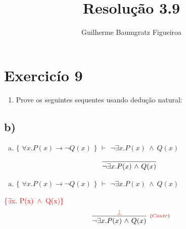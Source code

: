 \documentclass[aspectratio=43]{beamer}
\title[\sc{Resolu\c c\~ao}]{Resolu\c c\~ao 3.9}
\author[Guilherme Baumgratz Figueiroa]{Guilherme Baumgratz Figueiroa}
\institute[UFOP]{Universidade Federal de Ouro Preto} %
\date{}
\newcommand{\ex}{$\exists$}
\newcommand{\nao}{$\neg$}
\newcommand{\nex}{\nao\ex}
\newcommand{\andd}{$\wedge$}
\begin{document}
	
	\begin{frame}
		\titlepage
	\end{frame}
	
	\section{Exercic\'io 9}
	
	\begin{frame}%
    
    	\begin{enumerate}[1.]
			\item Prove os seguintes sequentes usando dedu\c c\~ao natural: \\
		\end{enumerate}
				
	\end{frame}
    \subsection{b)}
    
	\begin{frame}[fragile]
    	
    	\begin{enumerate}[b)]
			
			\item $\{$ $\forall x.P(x)\to \neg Q(x)$ $\}$ $\vdash$ $ \neg\exists  x.P(x)\ \wedge\ Q(x)$ \\ 
			
		\end{enumerate}
        \vspace{100pt}
        \[
        \begin{array}{c}
		
        	\infer[_{}]
            {$\nex$  x. P(x)\ $\andd$\ Q(x)}
            {}
        
		\end{array}
        \]
        
	\end{frame}
    
    \begin{frame}[fragile]
    	
    	\begin{enumerate}[b)]
			
			\item $\{$ $\forall x.P(x)\to \neg Q(x)$ $\}$ $\vdash$ $ \neg\exists  x.P(x)\ \wedge\ Q(x)$ \\ 
			
		\end{enumerate}
        \textcolor{red}{\{\ex  x. P(x)\ \andd\ Q(x)\}}
        \vspace{95pt}
        \[
        \begin{array}{c}
		
        	\infer[_{(\textcolor{red}{Contr})}]
            {$\nex$  x. P(x)\ $\andd$\ Q(x)}
            {\textcolor{red}{\bot}}
        
		\end{array}
        \]
        
	\end{frame}
    
\end{document}
